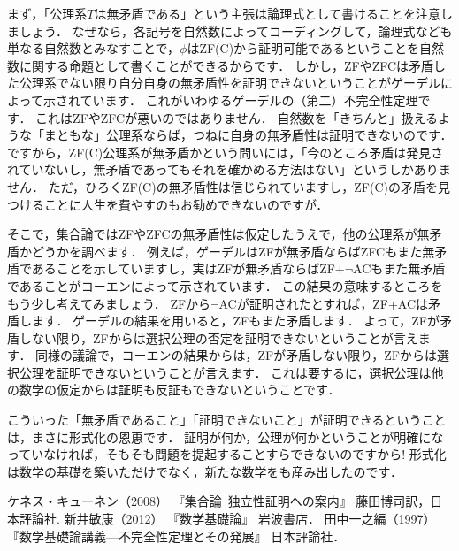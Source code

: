 \documentclass[./main]{subfiles}
\begin{document}
まず，「公理系$T$は無矛盾である」という主張は論理式として書けることを注意しましょう．
なぜなら，各記号を自然数によってコーディングして，論理式なども単なる自然数とみなすことで，$\phi$はZF(C)から証明可能であるということを自然数に関する命題として書くことができるからです．
しかし，ZFやZFCは矛盾した公理系でない限り自分自身の無矛盾性を証明できないということがゲーデルによって示されています．
これがいわゆるゲーデルの（第二）不完全性定理です．
これはZFやZFCが悪いのではありません．
自然数を「きちんと」扱えるような「まともな」公理系ならば，つねに自身の無矛盾性は証明できないのです．
ですから，ZF(C)公理系が無矛盾かという問いには，「今のところ矛盾は発見されていないし，無矛盾であってもそれを確かめる方法はない」というしかありません．
ただ，ひろくZF(C)の無矛盾性は信じられていますし，ZF(C)の矛盾を見つけることに人生を費やすのもお勧めできないのですが．

そこで，集合論ではZFやZFCの無矛盾性は仮定したうえで，他の公理系が無矛盾かどうかを調べます．
例えば，ゲーデルはZFが無矛盾ならばZFCもまた無矛盾であることを示していますし，実はZFが無矛盾ならばZF+$\neg$ACもまた無矛盾であることがコーエンによって示されています．
この結果の意味するところをもう少し考えてみましょう．
ZFから$\neg$ACが証明されたとすれば，ZF+ACは矛盾します．
ゲーデルの結果を用いると，ZFもまた矛盾します．
よって，ZFが矛盾しない限り，ZFからは選択公理の否定を証明できないということが言えます．
同様の議論で，コーエンの結果からは，ZFが矛盾しない限り，ZFからは選択公理を証明できないということが言えます．
これは要するに，選択公理は他の数学の仮定からは証明も反証もできないということです．

こういった「無矛盾であること」「証明できないこと」が証明できるということは，まさに形式化の恩恵です．
証明が何か，公理が何かということが明確になっていなければ，そもそも問題を提起することすらできないのですから!
形式化は数学の基礎を築いただけでなく，新たな数学をも産み出したのです．

\begin{thebibliography}{9}
 ケネス・キューネン（2008） 『集合論~独立性証明への案内』 藤田博司訳，日本評論社.
 新井敏康（2012） 『数学基礎論』 岩波書店．
 田中一之編（1997） 『数学基礎論講義---不完全性定理とその発展』 日本評論社．
\end{thebibliography}
\end{document}
